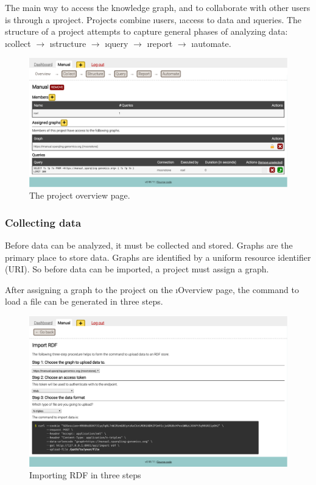   The main way to access the knowledge graph, and to collaborate with other
  users is through a \i{project}.  Projects combine \i{users},
  \i{access to data} and \i{queries}.  The structure of a project
  attempts to capture general phases of analyzing data: \i{collect}
  $\rightarrow$ \i{structure} $\rightarrow$ \i{query} $\rightarrow$
  \i{report} $\rightarrow$ \i{automate}.

  \begin{figure}[H]
    \begin{center}
      \includegraphics[width=1.0\textwidth]{figures/sg-web-project-details.pdf}
    \end{center}
    \caption{The project overview page.}
    \label{fig:web-project-overview}
  \end{figure}

\subsubsection{Collecting data}

  Before data can be analyzed, it must be collected and stored.  Graphs are
  the primary place to store data.  Graphs are identified by a uniform resource
  identifier (URI).  So before data can be imported, a project must assign a
  graph.

  After assigning a graph to the project on the \i{Overview} page, the
  command to load a file can be generated in three steps.

  \begin{figure}[H]
    \begin{center}
      \includegraphics[width=1.0\textwidth]{figures/sg-web-import-rdf.pdf}
    \end{center}
    \caption{Importing RDF in three steps}
    \label{fig:web-import-rdf}
  \end{figure}

